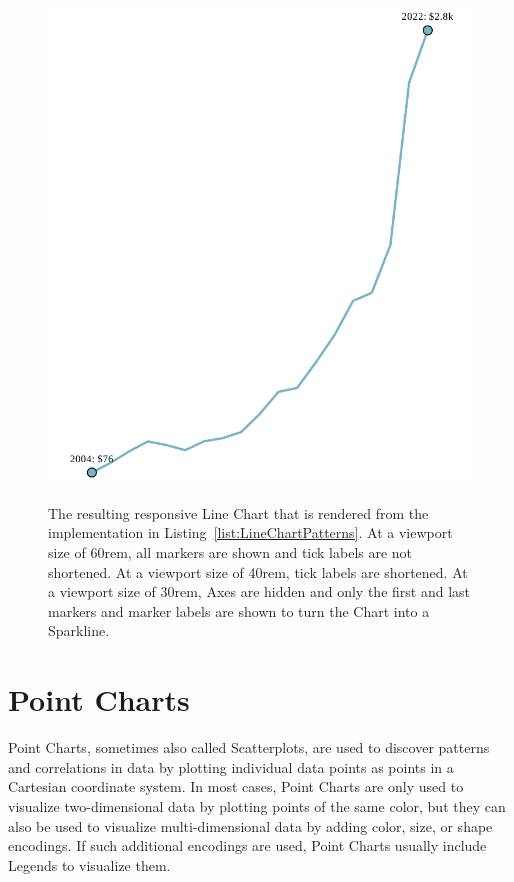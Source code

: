 \begin{figure}[tp]
{  \includegraphics[valign=b,scale=\respscale]{diagrams/respvis-line-30rem.pdf}%
  \label{fig:LineChartPatterns30rem}%
}
\caption[Responsive RespVis Line Chart]{
  The resulting responsive Line Chart that is rendered from the implementation in Listing~\ref{list:LineChartPatterns}.
   At a viewport size of 60rem, all markers are shown and tick labels are not shortened.
   At a viewport size of 40rem, tick labels are shortened.
   At a viewport size of 30rem, Axes are hidden and only the first and last markers and marker labels are shown to turn the Chart into a Sparkline.
}
\label{fig:LineChartPatterns}
\end{figure}

\section{Point Charts}
\label{sec:PointChartsUsage}

Point Charts, sometimes also called Scatterplots, are used to discover patterns and correlations in data by plotting individual data points as points in a Cartesian coordinate system.
In most cases, Point Charts are only used to visualize two-dimensional data by plotting points of the same color, but they can also be used to visualize multi-dimensional data by adding color, size, or shape encodings.
If such additional encodings are used, Point Charts usually include Legends to visualize them. 

